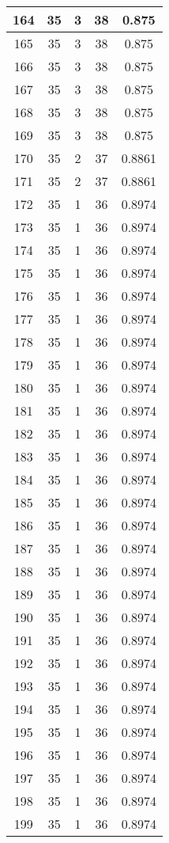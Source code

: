 \documentclass[letterpaper, 12pt]{article}
\begin{document}
\begin{longtable}{|c|c|c|c|c|}
\hline
164 & 35 & 3 & 38 & 0.875 \\
\hline
165 & 35 & 3 & 38 & 0.875 \\
\hline
166 & 35 & 3 & 38 & 0.875 \\
\hline
167 & 35 & 3 & 38 & 0.875 \\
\hline
168 & 35 & 3 & 38 & 0.875 \\
\hline
169 & 35 & 3 & 38 & 0.875 \\
\hline
170 & 35 & 2 & 37 & 0.8861 \\
\hline
171 & 35 & 2 & 37 & 0.8861 \\
\hline
172 & 35 & 1 & 36 & 0.8974 \\
\hline
173 & 35 & 1 & 36 & 0.8974 \\
\hline
174 & 35 & 1 & 36 & 0.8974 \\
\hline
175 & 35 & 1 & 36 & 0.8974 \\
\hline
176 & 35 & 1 & 36 & 0.8974 \\
\hline
177 & 35 & 1 & 36 & 0.8974 \\
\hline
178 & 35 & 1 & 36 & 0.8974 \\
\hline
179 & 35 & 1 & 36 & 0.8974 \\
\hline
180 & 35 & 1 & 36 & 0.8974 \\
\hline
181 & 35 & 1 & 36 & 0.8974 \\
\hline
182 & 35 & 1 & 36 & 0.8974 \\
\hline
183 & 35 & 1 & 36 & 0.8974 \\
\hline
184 & 35 & 1 & 36 & 0.8974 \\
\hline
185 & 35 & 1 & 36 & 0.8974 \\
\hline
186 & 35 & 1 & 36 & 0.8974 \\
\hline
187 & 35 & 1 & 36 & 0.8974 \\
\hline
188 & 35 & 1 & 36 & 0.8974 \\
\hline
189 & 35 & 1 & 36 & 0.8974 \\
\hline
190 & 35 & 1 & 36 & 0.8974 \\
\hline
191 & 35 & 1 & 36 & 0.8974 \\
\hline
192 & 35 & 1 & 36 & 0.8974 \\
\hline
193 & 35 & 1 & 36 & 0.8974 \\
\hline
194 & 35 & 1 & 36 & 0.8974 \\
\hline
195 & 35 & 1 & 36 & 0.8974 \\
\hline
196 & 35 & 1 & 36 & 0.8974 \\
\hline
197 & 35 & 1 & 36 & 0.8974 \\
\hline
198 & 35 & 1 & 36 & 0.8974 \\
\hline
199 & 35 & 1 & 36 & 0.8974 \\
\hline
\end{longtable}
\end{document}
